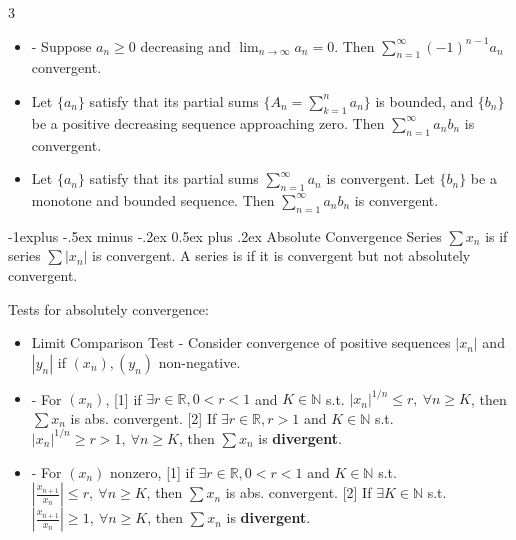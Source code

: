 \documentclass[10pt,landscape,letterpaper]{article}
\makeatletter
\renewcommand{\subsection}{\@startsection{subsection}{2}{0mm}%
                                {-1explus -.5ex minus -.2ex}%
                                {0.5ex plus .2ex}%
                                {\sffamily\normalsize\itshape}}
\makeatother
\begin{document}
\begin{multicols}{3}
\begin{itemize}
    \item {} - Suppose $a_n \geq 0$ decreasing and $\lim_{n\rightarrow\infty} a_n = 0$. Then $\sum_{n=1}^{\infty}(-1)^{n - 1}a_n$ convergent. 

    \item {} Let $\{a_n\}$ satisfy that its partial sums $\{A_n=\sum_{k=1}^n a_n\}$ is bounded, and $\{b_n\}$ be a positive decreasing sequence approaching zero. Then $\sum_{n=1}^\infty a_nb_n$ is convergent.

    \item {} Let $\{a_n\}$ satisfy that its partial sums $\sum_{n=1}^\infty a_n$ is convergent. Let $\{b_n\}$ be a monotone and bounded sequence. Then $\sum_{n=1}^\infty a_nb_n$ is convergent.
\end{itemize}





\subsection{Absolute Convergence}
Series $\sum x_n$ is  if series $\sum |x_n|$ is convergent. A series is  if it is convergent but not absolutely convergent.

Tests for absolutely convergence:
\begin{itemize}
    \item Limit Comparison Test - Consider convergence of positive sequences $|x_n|$ and $|y_n|$ if $(x_n), (y_n)$ non-negative.
    \item {} - For $(x_n)$, [1] if $\exists r \in \mathbb{R}, 0 < r < 1$ and $K \in \mathbb{N}$ s.t. $|x_n|^{1/n} \le r, \ \forall n \ge K$, then $\sum x_n$ is abs. convergent. [2] If $\exists r \in \mathbb{R}, r > 1$ and $K \in \mathbb{N}$ s.t. $|x_n|^{1/n} \ge r > 1, \ \forall n \ge K$, then $\sum x_n$ is \textbf{divergent}.
    \item {} - For $(x_n)$ nonzero, [1] if $\exists r \in \mathbb{R}, 0 < r < 1$ and $K \in \mathbb{N}$ s.t. $|\frac{x_{n+1}}{x_n}| \le r, \ \forall n \ge K$, then $\sum x_n$ is abs. convergent. [2] If $\exists K \in \mathbb{N}$ s.t. $|\frac{x_{n+1}}{x_n}| \ge 1, \ \forall n \ge K$, then $\sum x_n$ is \textbf{divergent}.

\end{itemize}



\end{multicols}
\end{document}
